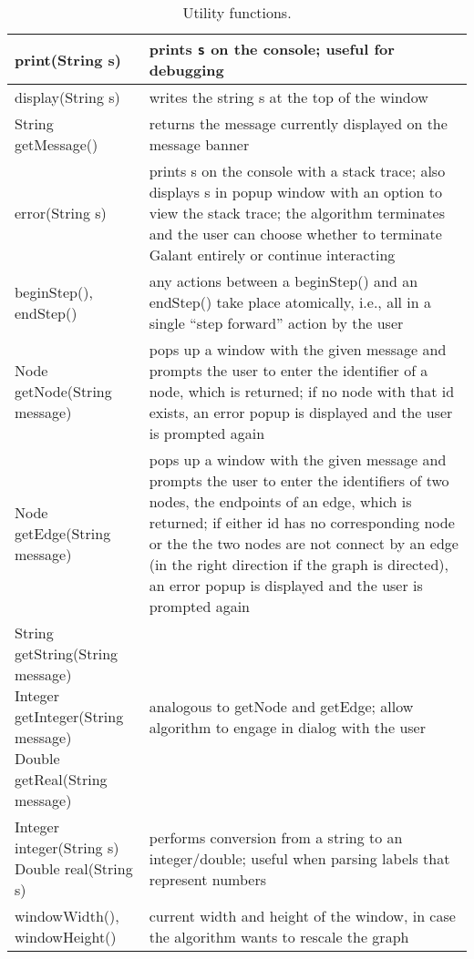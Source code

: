 \begin{table}
  \small
  \centering
  \begin{tabular}{| m{} | m{} |}
    \hline
    \textsf{print(String s)}
    &
    prints \texttt{s} on the console; useful for debugging
    \\ \hline
    \textsf{display(String s)}
    &
    writes the string \textsf{s} at the top of the window
    \\ \hline
    \textsf{String getMessage()}
    &
    returns the message currently displayed on the message banner
    \\ \hline
    \textsf{error(String s)}
    &
    prints \textsf{s} on the console with a stack trace; also displays
    \textsf{s} in popup window with an option to view the stack trace;
    the algorithm terminates and the user can choose whether to terminate
    Galant entirely or continue interacting
    \\ \hline
    \textsf{beginStep()},
    \textsf{endStep()}
    &
    any actions between a \textsf{beginStep()} and an \textsf{endStep()}
    take place atomically, i.e.,
    all in a single ``step forward'' action by the user
    \\ \hline
    \textsf{Node getNode(String message)}
    &
    pops up a window with the given message and prompts the user to enter the
    identifier of a node, which is returned;
    if no node with that id exists,
    an error popup is displayed and the user is prompted again
    \\ \hline
    \textsf{Node getEdge(String message)}
    &
    pops up a window with the given message and prompts the user to enter the
    identifiers of two nodes, the endpoints of an edge, which is returned;
    if either id has no corresponding node or the the two nodes are not connect
    by an edge (in the right direction if the graph is directed),
    an error popup is displayed and the user is prompted again
    \\ \hline
    \shortstack[l] {
      \textsf{String getString(String message)}\\
      \textsf{Integer getInteger(String message)}\\
      \textsf{Double getReal(String message)}
    }
    &
    analogous to \textsf{getNode} and \textsf{getEdge}; allow algorithm to engage
    in dialog with the user
    \\ \hline
    \shortstack[l] {
      \textsf{Integer integer(String s)}\\
      \textsf{Double real(String s)}
    }
    &
    performs conversion from a string to an integer/double; useful when parsing
    labels that represent numbers
    \\ \hline
    \textsf{windowWidth()}, \textsf{windowHeight()}
    &
    current width and height of the window, in case the algorithm wants to rescale
    the graph
    \\ \hline
  \end{tabular}
  \caption{Utility functions.}
  \label{tab:utility_functions}
\end{table}

